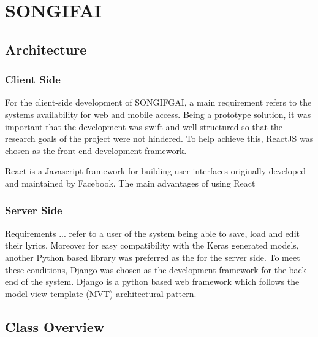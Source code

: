 \section{SONGIFAI}
\subsection{Architecture}
\subsubsection{Client Side}
For the client-side development of SONGIFGAI, a main requirement refers to the systems availability for web and mobile access. Being a prototype solution, it was important that the development was swift and well structured so that the research goals of the project were not hindered. To help achieve this, ReactJS was chosen as the front-end development framework.

\noindent
\newline
React is a Javascript framework for building user interfaces originally developed and maintained by Facebook. The main advantages of using React
\subsubsection{Server Side}
Requirements ... refer to a user of the system being able to save, load and edit their lyrics. Moreover for easy compatibility with the Keras generated models, another Python based library was preferred as the for the server side. To meet these conditions, Django was chosen as the development framework for the back-end of the system. Django is a python based web framework which follows the model-view-template (MVT) architectural pattern.
\subsection{Class Overview}
